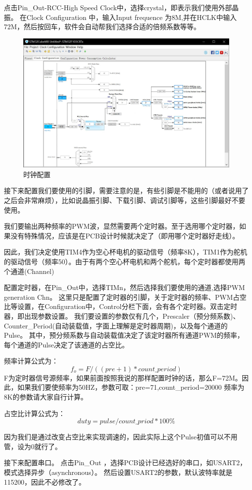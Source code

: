 \documentclass{article}
\begin{document}
点击Pin\_Out-RCC-High Speed Clock中，选择crystal，即表示我们使用外部晶振。
在Clock Configuration 中，输入Input frequence 为8M,并在HCLK中输入72M，然后按回车，软件会自动帮我们选择合适的倍频系数等等。

\begin{figure}[ht]
	\centering
	\includegraphics[scale=0.3]{时钟配置.jpg}
	\caption{时钟配置}
	\label{fig:label}
\end{figure}

接下来配置我们要使用的引脚，需要注意的是，有些引脚是不能用的（或者说用了之后会非常麻烦），比如说晶振引脚、下载引脚、调试引脚等，这些引脚最好不要使用。

我们要输出两种频率的PWM波，显然需要两个定时器。至于选用哪个定时器，如果没有特殊情况，应该是在PCB设计时候就决定了（即用哪个定时器好走线）。

因此，我们决定使用TIM4作为空心杯电机的驱动信号（频率8K），TIM1作为舵机的驱动信号（频率50）。由于有两个空心杯电机和两个舵机，每个定时器都使用两个通道(Channel)

配置定时器，在Pin\_Out中，选择TIMn，然后选择我们要使用的通道,选择PWM generation Chn。
这里只是配置了定时器的引脚，关于定时器的频率、PWM占空比等设置，在Configuration中，Control分栏下面，会有各个定时器。双击定时器，即出现参数设置。
我们要设置的参数仅有几个，Prescaler（预分频系数)、Counter\_Period(自动装载值，字面上理解是定时器周期)，以及每个通道的Pulse。
其中，预分频系数与自动装载值决定了该定时器所有通道PWM的频率，每个通道的Pulse决定了该通道的占空比。

频率计算公式为：
\begin{equation}
f_o=F/((pre+1) * count\_period)
\end{equation}
F为定时器信号源频率，如果前面按照我说的那样配置时钟的话，那么F=72M。因此，如果我们要使频率为50HZ，参数可取：pre=71,count\_period=20000
频率为8K的参数请大家自行计算。

占空比计算公式为：
\begin{equation}
duty=pulse/count\_priod*100\%
\end{equation}

因为我们是通过改变占空比来实现调速的，因此实际上这个Pulse初值可以不用管，设为0就行了。

接下来配置串口。
点击Pin\_Out ，选择PCB设计已经选好的串口，如USART2，模式选择异步（asynchronous）。
然后设置USART2的参数，默认波特率就是115200，因此不必修改了。
\end{document}
